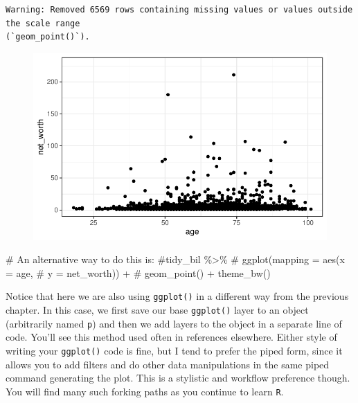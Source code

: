 \documentclass[
  letterpaper,
]{book}
\newenvironment{Shaded}{\begin{snugshade}}{\end{snugshade}}
\newcommand{\CommentTok}[1]{\textcolor[rgb]{0.37,0.37,0.37}{#1}}
\begin{document}
\begin{verbatim}
Warning: Removed 6569 rows containing missing values or values outside the scale range
(`geom_point()`).
\end{verbatim}

\begin{figure}[H]

{\centering \includegraphics{workflows-and-wrangling_files/figure-pdf/unnamed-chunk-24-1.pdf}

}

\end{figure}

\begin{Shaded}
\begin{Highlighting}[]
\CommentTok{\# An alternative way to do this is:}
\CommentTok{\#tidy\_bil \%\textgreater{}\%}
\CommentTok{\#  ggplot(mapping = aes(x = age,}
\CommentTok{\#                       y = net\_worth)) +}
\CommentTok{\#  geom\_point() + theme\_bw()}
\end{Highlighting}
\end{Shaded}

Notice that here we are also using \texttt{ggplot()} in a different way
from the previous chapter. In this case, we first save our base
\texttt{ggplot()} layer to an object (arbitrarily named \texttt{p}) and
then we add layers to the object in a separate line of code. You'll see
this method used often in references elsewhere. Either style of writing
your \texttt{ggplot()} code is fine, but I tend to prefer the piped
form, since it allows you to add filters and do other data manipulations
in the same piped command generating the plot. This is a stylistic and
workflow preference though. You will find many such forking paths as you
continue to learn \texttt{R}.
\end{document}
